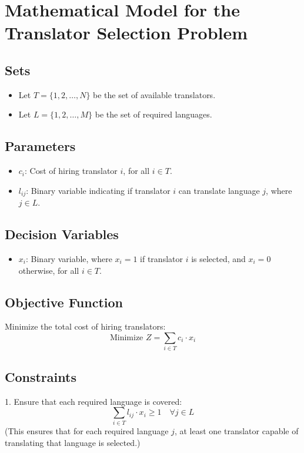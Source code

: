 \documentclass{article}
\begin{document}
\section*{Mathematical Model for the Translator Selection Problem}

\subsection*{Sets}
\begin{itemize}
    \item Let $T = \{1, 2, \ldots, N\}$ be the set of available translators.
    \item Let $L = \{1, 2, \ldots, M\}$ be the set of required languages.
\end{itemize}

\subsection*{Parameters}
\begin{itemize}
    \item $c_i$: Cost of hiring translator $i$, for all $i \in T$.
    \item $l_{ij}$: Binary variable indicating if translator $i$ can translate language $j$, where $j \in L$.
\end{itemize}

\subsection*{Decision Variables}
\begin{itemize}
    \item $x_i$: Binary variable, where $x_i = 1$ if translator $i$ is selected, and $x_i = 0$ otherwise, for all $i \in T$.
\end{itemize}

\subsection*{Objective Function}
Minimize the total cost of hiring translators:
\[
\text{Minimize } Z = \sum_{i \in T} c_i \cdot x_i
\]

\subsection*{Constraints}
1. Ensure that each required language is covered:
   \[
   \sum_{i \in T} l_{ij} \cdot x_i \geq 1 \quad \forall j \in L
   \]
   (This ensures that for each required language $j$, at least one translator capable of translating that language is selected.)
\end{document}
